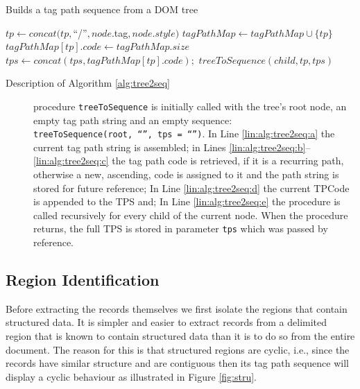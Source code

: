 \documentclass{vldb}
\begin{document}
\begin{algorithm}[H]
\caption{Builds a tag path sequence from a DOM tree}
\label{alg:tree2seq}
\begin{algorithmic}[1]
\State $tp \leftarrow
concat(tp,$``/''$,node.$tag$,node.style)$\label{lin:alg:tree2seq:a}
 \label{lin:alg:tree2seq:b}
\State $tagPathMap \leftarrow tagPathMap \cup \{tp\}$ 
\State $tagPathMap[tp].code \leftarrow tagPathMap.size$ 
\EndIf \label{lin:alg:tree2seq:c}
\State $tps \leftarrow
concat(tps,tagPathMap[tp].code);$\label{lin:alg:tree2seq:d}
\State $treeToSequence(child,tp,tps)$\label{lin:alg:tree2seq:e} 
\EndFor 
\EndProcedure
\end{algorithmic}
\end{algorithm}

\begin{description}
\item[Description of Algorithm \ref{alg:tree2seq}] procedure
\texttt{treeToSequence} is initially called with the tree's root node, an empty
tag path string and an empty sequence: \\\texttt{treeToSequence}\texttt{(root,
``'', tps = ``'')}. In Line \ref{lin:alg:tree2seq:a} the current tag path string is
assembled; in Lines \ref{lin:alg:tree2seq:b}--\ref{lin:alg:tree2seq:c} the tag
path code is retrieved, if it is a recurring path, otherwise a new, ascending,
code is assigned to it and the path string is stored for future reference; In
Line \ref{lin:alg:tree2seq:d} the current TPCode is appended to the TPS and; In
Line \ref{lin:alg:tree2seq:e} the procedure is called recursively for every
child of the current node. When the procedure returns, the full TPS is stored in
parameter \texttt{tps} which was passed by reference.
\end{description}

\subsection{Region Identification}\label{ss:regi}

Before extracting the records themselves we first isolate the regions that
contain structured data. It is simpler and easier to extract records from a
delimited region that is known to contain structured data than it is to do so
from the entire document. The reason for this is that structured regions are
cyclic, i.e., since the records have similar structure and are contiguous then
its tag path sequence will display a cyclic behaviour as illustrated in Figure
\ref{fig:stru}.
\end{document}
